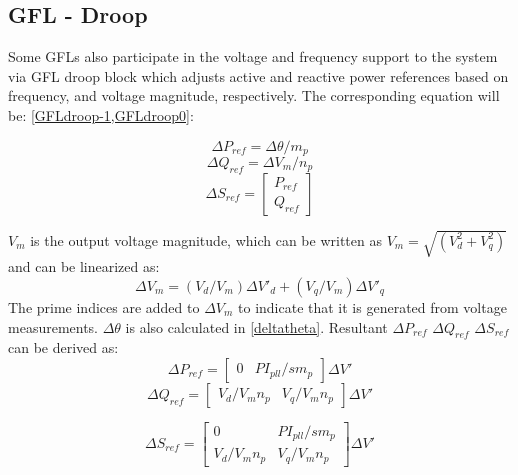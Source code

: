 \subsection{GFL - Droop}

Some GFLs also participate in the voltage and frequency support to the system via GFL droop block which adjusts active and reactive power references based on frequency, and voltage magnitude, respectively. The corresponding equation will be: \cref{GFLdroop-1,GFLdroop0}:

\begin{equation}\label{GFLdroop-1}
\Delta P_{ref}={\Delta \theta}/m_p
\end{equation}
\begin{equation}\label{GFLdroop0}
\Delta Q_{ref}={\Delta V_m}/n_p
\end{equation}
\begin{equation}\label{GFLdroop1}
\Delta S_{ref}=\begin{bmatrix} P_{ref} \\ Q_{ref}  \end{bmatrix}
\end{equation}

$V_m$ is the output voltage magnitude, which can be written as $V_m=\sqrt{(V^2_d+V^2_q)}$ and can be linearized as:
\begin{equation}\label{GFLdroop3}
\Delta V_m=(V_d/V_m)\Delta V'_d + (V_q/V_m)\Delta V'_q
\end{equation}
The prime indices are added to $\Delta V_m$ to indicate that it is generated from voltage measurements. $\Delta \theta$ is also calculated in \ref{deltatheta}. Resultant  $\Delta P_{ref}$ $\Delta Q_{ref}$ $\Delta S_{ref}$ can be derived as:
\begin{equation}\label{sref1}
\Delta P_{ref}=\begin{bmatrix}0 & PI_{pll}/{sm_p}\end{bmatrix}\Delta V'
\end{equation}
\begin{equation}\label{sref2}
\Delta Q_{ref}=\begin{bmatrix} V_d/{V_mn_p} & V_q/{V_mn_p}\end{bmatrix}\Delta V'
\end{equation}

\begin{equation}\label{sref3}
\Delta S_{ref}=\begin{bmatrix} 0 & PI_{pll}/{sm_p} \\ V_d/{V_mn_p} & V_q/{V_mn_p}\end{bmatrix}\Delta V'
\end{equation}

